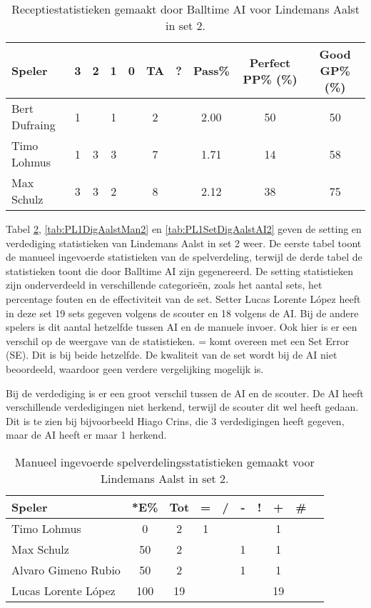 \begin{table}[ht!]
  \centering
  \scriptsize
  \begin{tabular}{|l|c|c|c|c|c|c|c|c|c|} \hline
    \textbf{Speler} & 3 & 2 & 1 & 0 & TA & ? & Pass\% & Perfect PP\% (\%) & Good GP\% (\%) \\ \hline
    Bert Dufraing & 1 &  & 1 &  & 2 &  & 2.00 & 50 & 50 \\
    Timo Lohmus & 1 & 3 & 3 &  & 7 &  & 1.71 & 14 & 58 \\
    Max Schulz & 3 & 3 & 2 &  & 8 &  & 2.12 & 38 & 75 \\  \hline
  \end{tabular}
  \caption[Receptiestatistieken gemaakt door Balltime AI voor Lindemans Aalst in set 2]{\label{tab:PL1ReceiveAalstAI2}Receptiestatistieken gemaakt door Balltime AI voor Lindemans Aalst in set 2.}
\end{table}

Tabel \ref{tab:PL1SetAalstMan2}, \ref{tab:PL1DigAalstMan2} en \ref{tab:PL1SetDigAalstAI2} geven de setting en verdediging statistieken van Lindemans Aalst in set 2 weer. De eerste tabel toont de manueel ingevoerde statistieken van de spelverdeling, terwijl de derde tabel de statistieken toont die door Balltime AI zijn gegenereerd. De setting statistieken zijn onderverdeeld in verschillende categorieën, zoals het aantal sets, het percentage fouten en de effectiviteit van de set. Setter Lucas Lorente López heeft in deze set 19 sets gegeven volgens de scouter en 18 volgens de AI. Bij de andere spelers is dit aantal hetzelfde tussen AI en de manuele invoer. Ook hier is er een verschil op de weergave van de statistieken. = komt overeen met een Set Error (SE). Dit is bij beide hetzelfde. De kwaliteit van de set wordt bij de AI niet beoordeeld, waardoor geen verdere vergelijking mogelijk is.

Bij de verdediging is er een groot verschil tussen de AI en de scouter. De AI heeft verschillende verdedigingen niet herkend, terwijl de scouter dit wel heeft gedaan. Dit is te zien bij bijvoorbeeld Hiago Crins, die 3 verdedigingen heeft gegeven, maar de AI heeft er maar 1 herkend.

\begin{table}[ht!]
  \centering
  \scriptsize
    \begin{tabular}{|l|c|c|c|c|c|c|c|c|c|} \hline
      \textbf{Speler} & *E\% & Tot & = & / & - & ! & + & \# \\ \hline
      Timo Lohmus & 0 & 2 & 1 &  &  &  & 1 &   \\
      Max Schulz & 50 & 2 &  &  & 1 & & 1 &  \\
      Alvaro Gimeno Rubio  & 50 & 2 &  &  & 1 &  & 1 &   \\ 
      Lucas Lorente López  & 100 & 19 &  &  &  &  & 19 &  \\ \hline
  \end{tabular}
  \caption[Manueel ingevoerde spelverdelingsstatistieken gemaakt voor Lindemans Aalst in set 2]{\label{tab:PL1SetAalstMan2}Manueel ingevoerde spelverdelingsstatistieken gemaakt voor Lindemans Aalst in set 2.}
\end{table}

